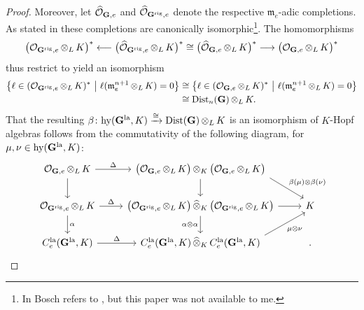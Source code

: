 \documentclass[a4paper, reqno, 10pt]{amsart}
\theoremstyle{definition}
\numberwithin{equation}{section}
\newcommand{\botimes}[1]{{\,\otimes_{#1}\,}}
\newcommand{\cotimes}[1]{{\,\widehat{\otimes}_{#1}\,}}
\newcommand{\hy}{{\mathrm{hy}}}
\newcommand{\la}{{\mathrm{la}}}
\newcommand{\lra}{\longrightarrow}
\newcommand{\rig}{{\mathrm{rig}}}
\let\originalmiddle\middle
\renewcommand{\middle}[1]{\,\originalmiddle#1\,}
\newcommand{\CO}{{\mathcal {O}}}
\newcommand{\bG}{{\mathrm{\bf G}}}
\newcommand{\Fm}{{\mathfrak {m}}}
\begin{document}
\begin{proof}
	
	Moreover, let $\widehat{\CO}_{\bG,e}$ and $\widehat{\CO}_{\bG^\rig,e}$ denote the respective $\Fm_e$-adic completions.
	As stated in \cite[p.\ 113]{Bosch14LectFormRigidGeom} these completions are canonically isomorphic\footnote{In \cite{Bosch14LectFormRigidGeom} Bosch refers to \cite[Satz 2.1]{Koepf74EigentlFamAlgVar}, but this paper was not available to me.}.
	The homomorphisms
	\begin{equation*}
		\big(\CO_{\bG^\rig, e} \botimes{L}K \big)^\ast \longleftarrow \big(\widehat{\CO}_{\bG^\rig, e} \botimes{L}K \big)^\ast \cong \big(\widehat{\CO}_{\bG, e} \botimes{L}K \big)^\ast \lra \big(\CO_{\bG, e} \botimes{L}K \big)^\ast
	\end{equation*}
	thus restrict to yield an isomorphism
	\begin{align*}
		\left\{ \ell \in (\CO_{\bG^\rig, e} \botimes{L}K )^\ast \middle{|} \ell( \Fm_e^{n+1} \botimes{L} K) = 0 \right\} 
		&\cong \left\{ \ell \in (\CO_{\bG, e} \botimes{L}K )^\ast \middle{|} \ell( \Fm_e^{n+1} \botimes{L} K) = 0 \right\} \\
		&\cong {\rm Dist}_n(\bG) \botimes{L} K .
	\end{align*}
	That the resulting $\beta \colon  \hy(\bG^\la,K) \xrightarrow{\cong} {\rm Dist}(\bG) \botimes{L} K$ is an isomorphism of $K$-Hopf algebras follows from the commutativity of the following diagram, for $\mu, \nu \in \hy(\bG^\la,K)$:	
	\begin{equation*}
		\begin{tikzcd}
			\CO_{\bG, e} \botimes{L} K \ar[r, "\Delta"]\ar[d] &\big(\CO_{\bG, e} \botimes{L} K \big) \botimes{K} \big(\CO_{\bG, e} \botimes{L} K \big)  \ar[rd, "\beta(\mu) \otimes \beta(\nu)", start anchor = 353, end anchor = 130] \ar[d] & \\
			\CO_{\bG^\rig, e} \botimes{L} K \ar[r, "\Delta"]\ar[d, "\alpha"]&\big( \CO_{\bG^\rig, e} \botimes{L} K \big) \cotimes{K} \big(\CO_{\bG^\rig, e} \botimes{L} K \big) \ar[r]\ar[d, "\alpha \otimes \alpha"']&K \\
			C^\la_e(\bG^\la,K) \ar[r, "\Delta"]  &C^\la_e(\bG^\la,K) \cotimes{K} C^\la_e(\bG^\la,K) \ar[ru,  "\mu \otimes \nu"', start anchor = 7, end anchor = 230]  &.
		\end{tikzcd}
	\end{equation*}
\end{proof}
\end{document}

